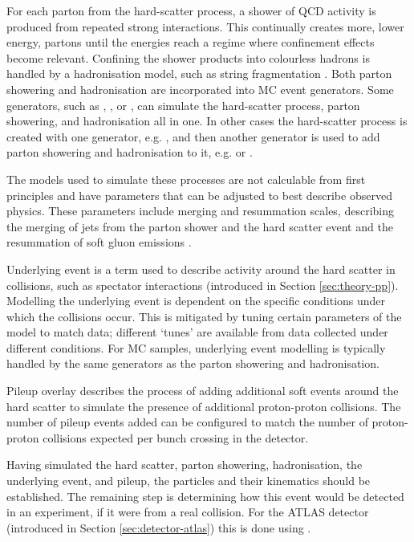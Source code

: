 For each parton from the hard-scatter process, a shower of \ac{QCD} activity is
produced from repeated strong interactions. This continually creates more, lower
energy, partons until the energies reach a regime where confinement effects
become relevant. Confining the shower products into colourless hadrons is
handled by a hadronisation model, such as string fragmentation
\cite{Andersson1983}. Both parton showering and hadronisation are incorporated
into \ac{MC} event generators. Some generators, such as \sherpa, \pythia, or
\herwig, can simulate the hard-scatter process, parton showering, and
hadronisation all in one. In other cases the hard-scatter process is created
with one generator, e.g.  \madgraph, and then another generator is used to add
parton showering and hadronisation to it, e.g. \pythia or \herwig.

The models used to simulate these processes are not calculable from first
principles and have parameters that can be adjusted to best describe observed
physics. These parameters include merging and resummation scales, describing the
merging of jets from the parton shower and the hard scatter event and the
resummation of soft gluon emissions \cite{sherpa2dot2}.

Underlying event is a term used to describe activity around the hard
scatter in collisions, such as spectator interactions
(introduced in Section \ref{sec:theory-pp}).
%
Modelling the underlying event is dependent on the specific conditions
under which the collisions occur. This is mitigated by tuning certain
parameters of the model to match data; different `tunes' are available from data
collected under different conditions. For \ac{MC} samples, underlying event
modelling is typically handled by the same generators as the parton showering
and hadronisation.

Pileup overlay describes the process of adding additional soft events around the
hard scatter to simulate the presence of additional proton-proton collisions.
The number of pileup events added can be configured to match the number of
proton-proton collisions expected per bunch crossing in the detector.

Having simulated the hard scatter, parton showering, hadronisation, the
underlying event, and pileup, the particles and their kinematics should be
established. The remaining step is determining how this event would be detected
in an experiment, if it were from a real collision. For the \acs{ATLAS} detector
(introduced in Section \ref{sec:detector-atlas}) this is done using \geantfour
\cite{geant4, ATLASsim1}.

